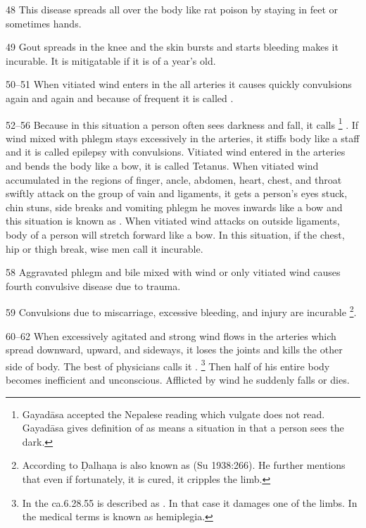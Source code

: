 \begin{translation}
\item[48] This disease spreads all over the body like rat poison by staying in feet or sometimes hands.

\item[49] Gout spreads in the knee and the skin bursts and starts bleeding makes it incurable. It is mitigatable if it is of a year’s old.

\item[50--51] When vitiated wind enters in the all arteries it causes
quickly convulsions again and again and because of frequent
 it is called .

\item[52--56] Because in this situation a person often sees darkness and
fall, it calls  \footnote{Gayadāsa
    accepted the Nepalese reading  which vulgate does not read.
    Gayadāsa gives definition of  as  means a
    situation in that a person sees the dark.} . If wind mixed with phlegm
    stays excessively in the arteries, it stiffs body like a staff and it is
    called  epilepsy with convulsions. Vitiated wind entered
    in the arteries and bends the body like a bow, it is called
     Tetanus. When vitiated wind accumulated in the regions
    of finger, ancle, abdomen, heart, chest, and throat swiftly attack on the
    group of vain and ligaments, it gets a person’s eyes stuck, chin stuns,
    side breaks and vomiting phlegm he moves inwards like a bow and this
    situation is known as . When vitiated wind
    attacks on outside ligaments, body of a person will stretch forward like
    a bow. In this situation, if the chest, hip or thigh break, wise men call
    it incurable.

\item[58] Aggravated phlegm and bile mixed with wind or only vitiated wind causes fourth convulsive disease due to trauma.

\item[59] Convulsions due to miscarriage, excessive bleeding, and injury are 
incurable \footnote{According to Ḍalhaṇa  is also 
known as 
 (Su 1938:266). He further mentions that even if fortunately, it is 
cured, it cripples the limb.}.

\item[60--62] When excessively agitated and strong wind flows in the arteries 
which spread downward, upward, and sideways, it loses the joints and kills the 
other side of body. The best of physicians calls it . 
\footnote{In the ca.6.28.55  is described as 
. In that case it damages one of the limbs.  In the 
medical terms  is known as hemiplegia.} Then half 
of his entire body becomes inefficient and unconscious. Afflicted by wind he 
suddenly falls or dies.


\end{translation}
